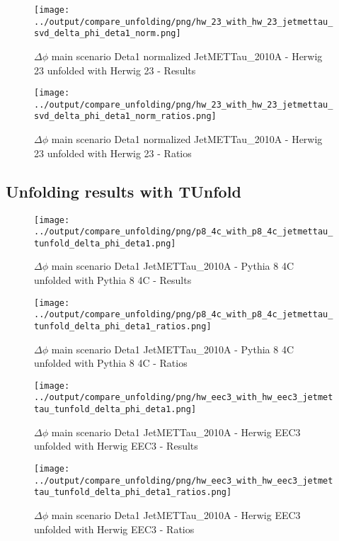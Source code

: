 \documentclass[11pt]{book}
\begin{document}
\begin{figure}[ht]
\centering
\texttt{[image: ../output/compare\_unfolding/png/hw\_23\_with\_hw\_23\_jetmettau\_svd\_delta\_phi\_deta1\_norm.png]}
\caption{$\Delta\phi$ main scenario Deta1 normalized JetMETTau\_2010A - Herwig 23 unfolded with Herwig 23 - Results}
\label{hw_23_hw_23_jetmettau_svd_delta_phi_deta1_norm_a}
\end{figure}

\begin{figure}[ht]
\centering
\texttt{[image: ../output/compare\_unfolding/png/hw\_23\_with\_hw\_23\_jetmettau\_svd\_delta\_phi\_deta1\_norm\_ratios.png]}
\caption{$\Delta\phi$ main scenario Deta1 normalized JetMETTau\_2010A - Herwig 23 unfolded with Herwig 23 - Ratios}
\label{hw_23_hw_23_jetmettau_svd_delta_phi_deta1_norm_b}
\end{figure}


\clearpage
\subsection{Unfolding results with TUnfold}
\begin{figure}[ht]
\centering
\texttt{[image: ../output/compare\_unfolding/png/p8\_4c\_with\_p8\_4c\_jetmettau\_tunfold\_delta\_phi\_deta1.png]}
\caption{$\Delta\phi$ main scenario Deta1 JetMETTau\_2010A - Pythia 8 4C unfolded with Pythia 8 4C - Results}
\label{p8_p8_jetmettau_tunfold_delta_phi_deta1_a}
\end{figure}

\begin{figure}[ht]
\centering
\texttt{[image: ../output/compare\_unfolding/png/p8\_4c\_with\_p8\_4c\_jetmettau\_tunfold\_delta\_phi\_deta1\_ratios.png]}
\caption{$\Delta\phi$ main scenario Deta1 JetMETTau\_2010A - Pythia 8 4C unfolded with Pythia 8 4C - Ratios}
\label{p8_p8_jetmettau_tunfold_delta_phi_deta1_b}
\end{figure}

\begin{figure}[ht]
\centering
\texttt{[image: ../output/compare\_unfolding/png/hw\_eec3\_with\_hw\_eec3\_jetmettau\_tunfold\_delta\_phi\_deta1.png]}
\caption{$\Delta\phi$ main scenario Deta1 JetMETTau\_2010A - Herwig EEC3 unfolded with Herwig EEC3 - Results}
\label{hw_eec3_hw_eec3_jetmettau_tunfold_delta_phi_deta1_a}
\end{figure}

\begin{figure}[ht]
\centering
\texttt{[image: ../output/compare\_unfolding/png/hw\_eec3\_with\_hw\_eec3\_jetmettau\_tunfold\_delta\_phi\_deta1\_ratios.png]}
\caption{$\Delta\phi$ main scenario Deta1 JetMETTau\_2010A - Herwig EEC3 unfolded with Herwig EEC3 - Ratios}
\label{hw_eec3_hw_eec3_jetmettau_tunfold_delta_phi_deta1_b}
\end{figure}
\end{document}
